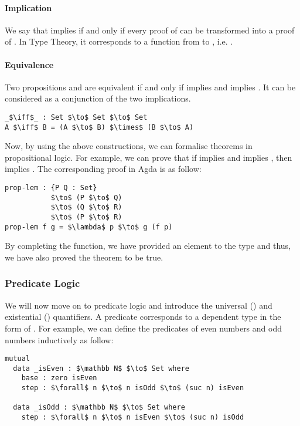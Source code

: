 \paragraph{Implication} We say that  implies  if and only
if every proof of  can be transformed into a proof of . In Type
Theory, it corresponds to a function from  to , i.e. . 

\paragraph{Equivalence} Two propositions  and
 are equivalent if and only if  implies  and  implies
. It can be considered as a conjunction of the two implications.
\begin{lstlisting}[mathescape=true,xleftmargin=.3\textwidth]
_$\iff$_ : Set $\to$ Set $\to$ Set
A $\iff$ B = (A $\to$ B) $\times$ (B $\to$ A)
\end{lstlisting} 

\par Now, by using the above constructions, we can formalise
 theorems in propositional logic. For example, we can prove that if  implies  and
 implies , then  implies . The corresponding
proof in Agda is as follow:
\begin{lstlisting}[mathescape=true,xleftmargin=.3\textwidth]
prop-lem : {P Q : Set} 
           $\to$ (P $\to$ Q) 
           $\to$ (Q $\to$ R) 
           $\to$ (P $\to$ R)
prop-lem f g = $\lambda$ p $\to$ g (f p)
\end{lstlisting} 

\par By completing the function, we have provided an element
to the type  and thus, we have
also proved the theorem to be true. 


\subsubsection{Predicate Logic} 
\par We will now move on to predicate logic and
introduce the universal (\mb{\forall}) and existential (\mb{\exists})
quantifiers. A predicate corresponds to a dependent type in the
form of . For example, we can
define the predicates of even numbers and odd numbers inductively as follow:
\begin{lstlisting}[mathescape=true,xleftmargin=.3\textwidth]
mutual
  data _isEven : $\mathbb N$ $\to$ Set where
    base : zero isEven
    step : $\forall$ n $\to$ n isOdd $\to$ (suc n) isEven

  data _isOdd : $\mathbb N$ $\to$ Set where
    step : $\forall$ n $\to$ n isEven $\to$ (suc n) isOdd
\end{lstlisting} 

